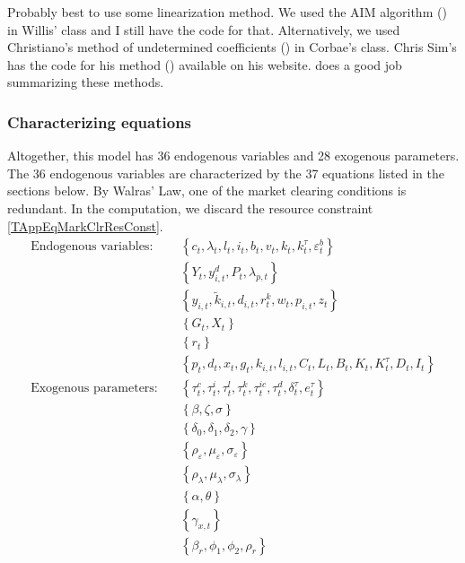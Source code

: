 \documentclass[article,11pt,letterpaper,fleqn]{article}
\theoremstyle{definition}
\numberwithin{equation}{section}
\newcommand{\cn}{\citeasnoun} %
\newcommand\ve{\varepsilon}
\begin{document}
Probably best to use some linearization method.  We used the AIM algorithm (\cn{AM1985}) in Willis' class and I still have the code for that.  Alternatively, we used Christiano's method of undetermined coefficients (\cn{Christiano2002}) in Corbae's class.  Chris Sim's has the code for his method (\cn{Sims2002}) available on his website.  \cn{Uhlig1998} does a good job summarizing these methods.

\subsubsection{Characterizing equations}
\label{TAppCharEqs}

Altogether, this model has 36 endogenous variables and 28 exogenous parameters. The 36 endogenous variables are characterized by the 37 equations listed in the sections below. By Walras' Law, one of the market clearing conditions is redundant. In the computation, we discard the resource constraint \eqref{TAppEqMarkClrResConst}.
\begin{align*}
   \text{Endogenous variables:}\quad &\left\{c_t,\lambda_t,l_t,i_t,b_t,v_t,k_t,k_t^\tau,\ve_t^b\right\} \\
   &\left\{Y_t,y_{i,t}^d,P_t,\lambda_{p,t}\right\} \\
   &\left\{y_{i,t},\tilde{k}_{i,t},d_{i,t},r_t^k,w_t,p_{i,t},z_t\right\} \\
   &\left\{G_t,X_t\right\} \\
   &\left\{r_t\right\} \\
   &\left\{p_t,d_t,x_t,g_t,k_{i,t},l_{i,t},C_t,L_t,B_t,K_t,K_t^\tau,D_t,I_t\right\} \\
   \text{Exogenous parameters:}\quad &\left\{\tau_t^c,\tau_t^i,\tau_t^l,\tau_t^k,\tau_t^{ic},\tau_t^d,\delta_t^\tau,e_t^\tau\right\} \\
   &\left\{\beta,\zeta,\sigma\right\} \\
   &\left\{\delta_0,\delta_1,\delta_2,\gamma\right\} \\
   &\left\{\rho_\ve,\mu_\ve,\sigma_\ve\right\} \\
   &\left\{\rho_\lambda,\mu_\lambda,\sigma_\lambda\right\} \\
   &\left\{\alpha,\theta\right\} \\
   &\left\{\gamma_{x,t}\right\} \\
   &\left\{\beta_r,\phi_1,\phi_2,\rho_r\right\}
\end{align*}
\end{document}
